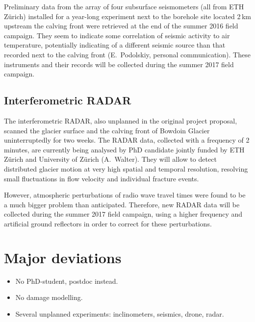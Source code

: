 \documentclass{article}
\begin{document}
Preliminary data from the array of four subsurface seismometers (all from ETH
Zürich) installed for a year-long experiment next to the borehole site located
2\,km upstream the calving front were retrieved at the end of the summer 2016
field campaign. They seem to indicate some correlation of seismic activity to
air temperature, potentially indicating of a different seismic source than that
recorded next to the calving front (E.~Podolskiy, personal communication).
These instruments and their records will be collected during the summer 2017
field campaign.


\subsection{Interferometric RADAR}

The interferometric RADAR, also unplanned in the original project proposal,
scanned the glacier surface and the calving front of Bowdoin Glacier
uninterruptedly for two weeks. The RADAR data, collected with a frequency of
2\,minutes, are currently being analysed by PhD candidate jointly funded by
ETH Zürich and University of Zürich (A.~Walter). They will allow to detect
distributed glacier motion at very high spatial and temporal resolution,
resolving small fluctuations in flow velocity and individual fracture events.

However, atmospheric perturbations of radio wave travel times were found to be
a much bigger problem than anticipated. Therefore, new RADAR data will be
collected during the summer 2017 field campaign, using a higher frequency and
artificial ground reflectors in order to correct for these perturbations.


\section{Major deviations}

\begin{itemize}
\item No PhD-student, postdoc instead.
\item No damage modelling.
\item Several unplanned experiments: inclinometers, seismics, drone, radar.
\end{itemize}

\end{document}
